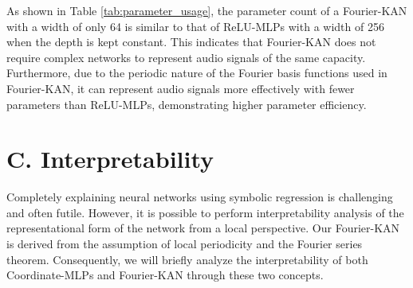 \documentclass[letterpaper]{article} %
\newtheorem{theorem}{Theorem}
\newtheorem{assumption}{Assumption}
\begin{document}
As shown in Table \ref{tab:parameter_usage}, the parameter count of a Fourier-KAN with a width of only 64 is similar to that of ReLU-MLPs with a width of 256 when the depth is kept constant. This indicates that Fourier-KAN does not require complex networks to represent audio signals of the same capacity. Furthermore, due to the periodic nature of the Fourier basis functions used in Fourier-KAN, it can represent audio signals more effectively with fewer parameters than ReLU-MLPs, demonstrating higher parameter efficiency.


\section{C. Interpretability}
Completely explaining neural networks using symbolic regression is challenging and often futile. However, it is possible to perform interpretability analysis of the representational form of the network from a local perspective. Our Fourier-KAN is derived from the assumption of local periodicity and the Fourier series theorem. Consequently, we will briefly analyze the interpretability of both Coordinate-MLPs and Fourier-KAN through these two concepts.

\begin{table}[!ht]
    \centering
\end{table}
\end{document}
